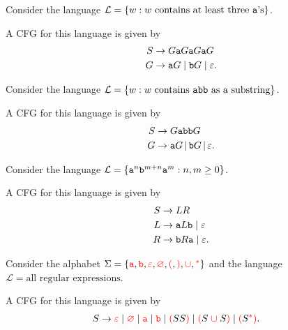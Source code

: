 \documentclass{notes}
\begin{document}
\begin{eg}
  Consider the language $\mathcal L = \left \{ w : \text{$w$ contains at least three \verb~a~'s} \right \}$.

  A CFG for this language is given by 
  \begin{align*}
    S &\to G \verb~a~ G \verb~a~ G \verb~a~ G \\ 
    G &\to  \verb~a~ G \; | \; \verb~b~ G \; | \; \varepsilon.
  \end{align*}
\end{eg}

\begin{eg}
  Consider the language $\mathcal L = \left \{ w : \text{$w$ contains \verb~abb~ as a substring} \right \}$.
  
  A CFG for this language is given by 
  \begin{align*}
    S &\to G \verb~abb~ G \\ 
    G &\to \verb~a~ G \, | \, \verb~b~ G \, | \, \varepsilon.
  \end{align*}
\end{eg}

\begin{eg}
  Consider the language $\mathcal L = \left \{ \verb~a~^n \verb~b~^{m + n} \verb~a~^m : n, m \geq 0 \right \}$.
  
  A CFG for this language is given by 
  \begin{align*}
    S &\to L R \\ 
    L &\to \verb~a~ L \verb~b~ \; | \; \varepsilon \\ 
    R &\to \verb~b~ R \verb~a~ \; | \; \varepsilon.
  \end{align*}
\end{eg}

\begin{eg}
  Consider the alphabet $\Sigma = \left \{ {\color{red} \verb~a~}, {\color{red} \verb~b~}, {\color{red} \varepsilon}, {\color{red} \varnothing}, {\color{red} (}, {\color{red} )}, {\color{red} \cup}, {\color{red} {}^*} \right \}$ and the language $\mathcal L = \text{all regular expressions}$.

  A CFG for this language is given by 
  \begin{align*}
    S &\to {\color{red} \varepsilon} \; | \; {\color{red} \varnothing} \; | \; {\color{red} \verb~a~} \; | \; {\color{red} \verb~b~} \; | \; {\color{red} (} S S {\color{red} )} \; | \; {\color{red} (} S \; {\color{red} \cup} \; S {\color{red} )} \; | \; {\color{red} (} S {\color{red} {}^*} {\color{red} )}.
  \end{align*}
\end{eg}
\end{document}
